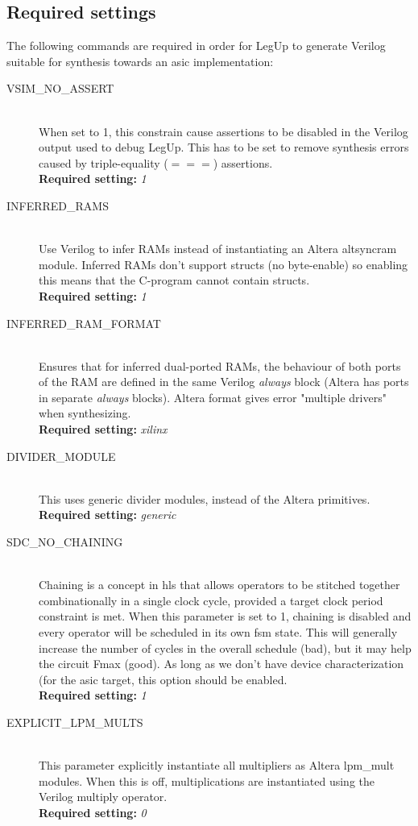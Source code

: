 \subsection{\label{subsec:hlsreqconst}Required settings}
The following commands are required in order for LegUp to generate Verilog suitable for synthesis towards an \gls{asic} implementation:
\begin{description}
  \item[VSIM\_NO\_ASSERT] \hfill \\
      When set to 1, this constrain cause assertions to be disabled in the Verilog output used to debug LegUp. This has to be set to remove synthesis errors caused by triple-equality ($===$) assertions. \hfill \\
      \textbf{Required setting:} \textit{1}
  \item[INFERRED\_RAMS] \hfill \\
      Use Verilog to infer RAMs instead of instantiating an Altera altsyncram module. Inferred RAMs don’t support structs (no byte-enable) so enabling this means that the C-program cannot contain structs. \hfill \\
      \textbf{Required setting:} \textit{1}
  \item[INFERRED\_RAM\_FORMAT] \hfill \\
      Ensures that for inferred dual-ported RAMs, the behaviour of both ports of the RAM are defined in the same Verilog \textit{always} block (Altera has ports in separate \textit{always} blocks). Altera format gives error "multiple drivers" when synthesizing.\hfill \\
      \textbf{Required setting:} \textit{xilinx}
  \item[DIVIDER\_MODULE] \hfill \\
      This uses generic divider modules, instead of the Altera primitives.\hfill \\
      \textbf{Required setting:} \textit{generic}
  \item[SDC\_NO\_CHAINING] \hfill \\
      Chaining is a concept in \gls{hls} that allows operators to be stitched together combinationally in a single clock cycle, provided a target clock period constraint is met. When this parameter is set to 1, chaining is disabled and every operator will be scheduled in its own \gls{fsm} state. This will generally increase the number of cycles in the overall schedule (bad), but it may help the circuit Fmax (good). As long as we don't have device characterization (for the \gls{asic} target, this option should be enabled.\hfill \\
      \textbf{Required setting:} \textit{1}
  \item[EXPLICIT\_LPM\_MULTS] \hfill \\
      This parameter explicitly instantiate all multipliers as Altera lpm\_mult modules. When this is off, multiplications are instantiated using the Verilog multiply operator.\hfill \\
      \textbf{Required setting:} \textit{0}
\end{description}
